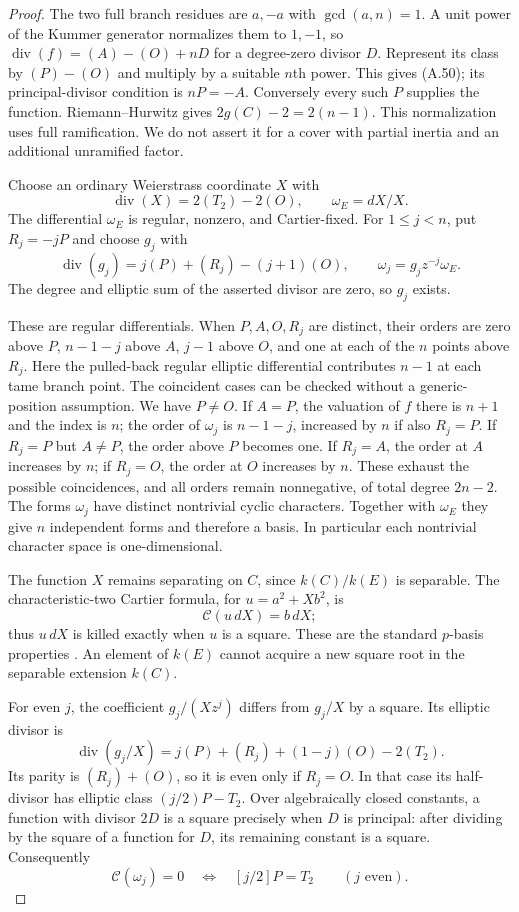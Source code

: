 \begin{proof}
The two full branch residues are $a,-a$ with
$\gcd(a,n)=1$. A unit power of the Kummer generator
normalizes them to $1,-1$, so
$\operatorname{div}(f)=(A)-(O)+nD$ for a degree-zero
divisor $D$. Represent its class by $(P)-(O)$ and
multiply by a suitable $n$th power. This gives
\textup{(A.50)}; its principal-divisor condition is
$nP=-A$. Conversely every such $P$ supplies the function.
Riemann--Hurwitz gives $2g(C)-2=2(n-1)$.
This normalization uses full ramification. We do not
assert it for a cover with partial inertia and an
additional unramified factor.

Choose an ordinary Weierstrass coordinate $X$ with
\[
 \operatorname{div}(X)=2(T_2)-2(O),\qquad \omega_E=dX/X.
\]
The differential $\omega_E$ is regular, nonzero, and
Cartier-fixed. For $1\le j<n$, put $R_j=-jP$ and choose
$g_j$ with
\[
 \operatorname{div}(g_j)=j(P)+(R_j)-(j+1)(O),\qquad
 \omega_j=g_jz^{-j}\omega_E.                              \tag{A.51}
\]
The degree and elliptic sum of the asserted divisor
are zero, so $g_j$ exists.

These are regular differentials. When $P,A,O,R_j$ are
distinct, their orders are zero above $P$, $n-1-j$
above $A$, $j-1$ above $O$, and one at each of the $n$
points above $R_j$. Here the pulled-back regular
elliptic differential contributes $n-1$ at each tame
branch point. The coincident cases can be checked
without a generic-position assumption. We have
$P\ne O$. If $A=P$, the valuation of $f$ there is
$n+1$ and the index is $n$; the order of $\omega_j$
is $n-1-j$, increased by $n$ if also $R_j=P$.
If $R_j=P$ but $A\ne P$, the order above $P$ becomes
one. If $R_j=A$, the order at $A$ increases by $n$;
if $R_j=O$, the order at $O$ increases by $n$.
These exhaust the possible coincidences, and all
orders remain nonnegative, of total degree $2n-2$.
The forms $\omega_j$ have distinct nontrivial cyclic
characters. Together with $\omega_E$ they give $n$
independent forms and therefore a basis. In particular
each nontrivial character space is one-dimensional.

The function $X$ remains separating on $C$, since
$k(C)/k(E)$ is separable. The characteristic-two
Cartier formula, for $u=a^2+Xb^2$, is
\[
 \mathcal C(u\,dX)=b\,dX;
\]
thus $u\,dX$ is killed exactly when $u$ is a square.
These are the standard $p$-basis properties
\citep[Section 2f, p.~513]{A_ElkinPries2013}.
An element of $k(E)$ cannot acquire a new square root
in the separable extension $k(C)$.

For even $j$, the coefficient $g_j/(Xz^j)$ differs
from $g_j/X$ by a square. Its elliptic divisor is
\[
 \operatorname{div}(g_j/X)
   =j(P)+(R_j)+(1-j)(O)-2(T_2).
\]
Its parity is $(R_j)+(O)$, so it is even only if
$R_j=O$. In that case its half-divisor has elliptic
class $(j/2)P-T_2$. Over algebraically closed constants,
a function with divisor $2D$ is a square precisely
when $D$ is principal: after dividing by the square
of a function for $D$, its remaining constant is a
square. Consequently
\[
 \mathcal C(\omega_j)=0
       \quad\Longleftrightarrow\quad [j/2]P=T_2
       \qquad(j\text{ even}).                           \tag{A.52}
\]


\end{proof}
